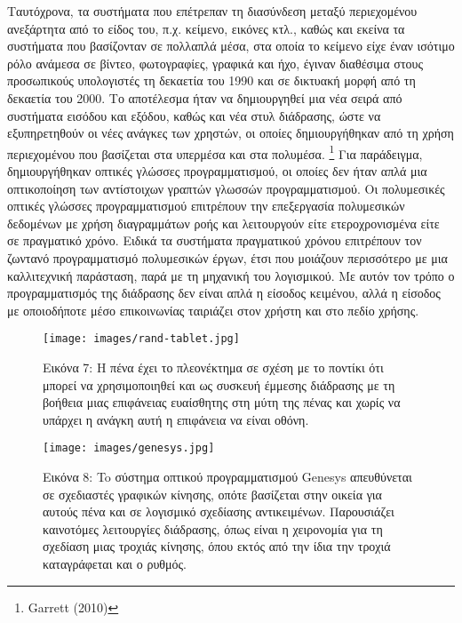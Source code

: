 \documentclass[
]{article}
\begin{document}
Ταυτόχρονα, τα συστήματα που επέτρεπαν τη διασύνδεση μεταξύ περιεχομένου
ανεξάρτητα από το είδος του, π.χ. κείμενο, εικόνες κτλ., καθώς και
εκείνα τα συστήματα που βασίζονταν σε πολλαπλά μέσα, στα οποία το
κείμενο είχε έναν ισότιμο ρόλο ανάμεσα σε βίντεο, φωτογραφίες, γραφικά
και ήχο, έγιναν διαθέσιμα στους προσωπικούς υπολογιστές τη δεκαετία του
1990 και σε δικτυακή μορφή από τη δεκαετία του 2000. Το αποτέλεσμα ήταν
να δημιουργηθεί μια νέα σειρά από συστήματα εισόδου και εξόδου, καθώς
και νέα στυλ διάδρασης, ώστε να εξυπηρετηθούν οι νέες ανάγκες των
χρηστών, οι οποίες δημιουργήθηκαν από τη χρήση περιεχομένου που
βασίζεται στα υπερμέσα και στα πολυμέσα. \footnote{Garrett (2010)} Για
παράδειγμα, δημιουργήθηκαν οπτικές γλώσσες προγραμματισμού, οι οποίες
δεν ήταν απλά μια οπτικοποίηση των αντίστοιχων γραπτών γλωσσών
προγραμματισμού. Οι πολυμεσικές οπτικές γλώσσες προγραμματισμού
επιτρέπουν την επεξεργασία πολυμεσικών δεδομένων με χρήση διαγραμμάτων
ροής και λειτουργούν είτε ετεροχρονισμένα είτε σε πραγματικό χρόνο.
Ειδικά τα συστήματα πραγματικού χρόνου επιτρέπουν τον ζωντανό
προγραμματισμό πολυμεσικών έργων, έτσι που μοιάζουν περισσότερο με μια
καλλιτεχνική παράσταση, παρά με τη μηχανική του λογισμικού. Με αυτόν τον
τρόπο ο προγραμματισμός της διάδρασης δεν είναι απλά η είσοδος κειμένου,
αλλά η είσοδος με οποιοδήποτε μέσο επικοινωνίας ταιριάζει στον χρήστη
και στο πεδίο χρήσης.

\leavevmode{}%
\begin{figure}
\hypertarget{fig:rand-tablet}{%
\centering
\texttt{[image: images/rand-tablet.jpg]}
\caption{Εικόνα 7: Η πένα έχει το πλεονέκτημα σε σχέση με το ποντίκι ότι
μπορεί να χρησιμοποιηθεί και ως συσκευή έμμεσης διάδρασης με τη βοήθεια
μιας επιφάνειας ευαίσθητης στη μύτη της πένας και χωρίς να υπάρχει η
ανάγκη αυτή η επιφάνεια να είναι οθόνη.}\label{fig:rand-tablet}
}
\end{figure}

\leavevmode{}%
\begin{figure}
\hypertarget{fig:genesys}{%
\centering
\texttt{[image: images/genesys.jpg]}
\caption{Εικόνα 8: To σύστημα οπτικού προγραμματισμού Genesys
απευθύνεται σε σχεδιαστές γραφικών κίνησης, οπότε βασίζεται στην οικεία
για αυτούς πένα και σε λογισμικό σχεδίασης αντικειμένων. Παρουσιάζει
καινοτόμες λειτουργίες διάδρασης, όπως είναι η χειρονομία για τη
σχεδίαση μιας τροχιάς κίνησης, όπου εκτός από την ίδια την τροχιά
καταγράφεται και ο ρυθμός.}\label{fig:genesys}
}
\end{figure}
\end{document}
